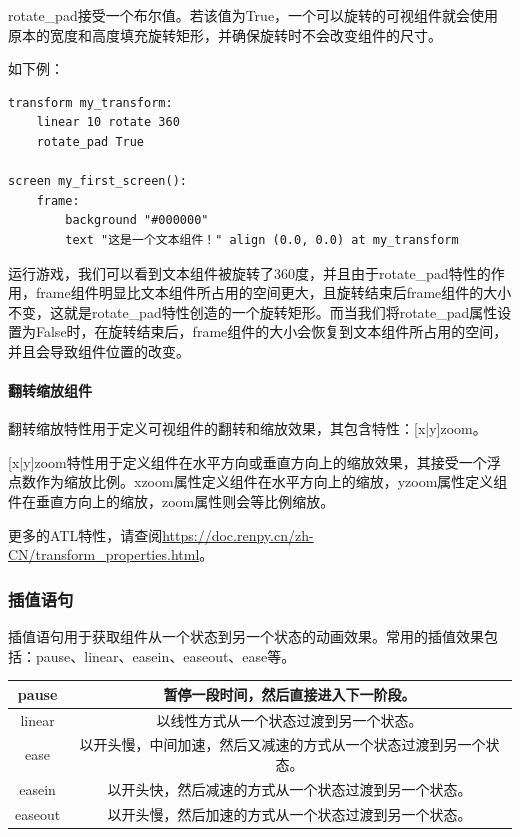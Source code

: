 \documentclass[../../Main.tex]{subfiles}
\begin{document}
rotate\_pad接受一个布尔值。若该值为True，一个可以旋转的可视组件就会使用原本的宽度和高度填充旋转矩形，并确保旋转时不会改变组件的尺寸。

如下例：

\begin{lstlisting}
transform my_transform:
    linear 10 rotate 360
    rotate_pad True

screen my_first_screen():
    frame:
        background "#000000"
        text "这是一个文本组件！" align (0.0, 0.0) at my_transform
\end{lstlisting}

运行游戏，我们可以看到文本组件被旋转了360度，并且由于rotate\_pad特性的作用，frame组件明显比文本组件所占用的空间更大，且旋转结束后frame组件的大小不变，这就是rotate\_pad特性创造的一个旋转矩形。而当我们将rotate\_pad属性设置为False时，在旋转结束后，frame组件的大小会恢复到文本组件所占用的空间，并且会导致组件位置的改变。

\paragraph{翻转缩放组件}
翻转缩放特性用于定义可视组件的翻转和缩放效果，其包含特性：[x|y]zoom。

[x|y]zoom特性用于定义组件在水平方向或垂直方向上的缩放效果，其接受一个浮点数作为缩放比例。xzoom属性定义组件在水平方向上的缩放，yzoom属性定义组件在垂直方向上的缩放，zoom属性则会等比例缩放。

更多的ATL特性，请查阅\url{https://doc.renpy.cn/zh-CN/transform_properties.html}。

\subsubsection{插值语句}
插值语句用于获取组件从一个状态到另一个状态的动画效果。常用的插值效果包括：pause、linear、easein、easeout、ease等。

\begin{center}
    \tabletail{\hline}
    \tablelasttail{\hline}
    \begin{supertabular}{|c|c|}
        \hline
        pause & 暂停一段时间，然后直接进入下一阶段。\\
        \hline
        linear & 以线性方式从一个状态过渡到另一个状态。\\
        \hline
        ease & 以开头慢，中间加速，然后又减速的方式从一个状态过渡到另一个状态。\\
        \hline
        easein & 以开头快，然后减速的方式从一个状态过渡到另一个状态。\\
        \hline
        easeout & 以开头慢，然后加速的方式从一个状态过渡到另一个状态。\\
    \end{supertabular}
\end{center}
\end{document}

